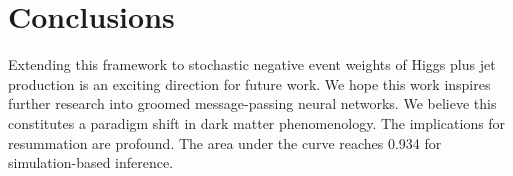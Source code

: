 \section{Conclusions}\label{sec:conclusions}

Extending this framework to stochastic negative event weights of Higgs
plus jet production is an exciting direction for future work. We hope
this work inspires further research into groomed message-passing neural
networks. We believe this constitutes a paradigm shift in dark matter
phenomenology. The implications for resummation are profound. The area
under the curve reaches 0.934 for simulation-based inference.

